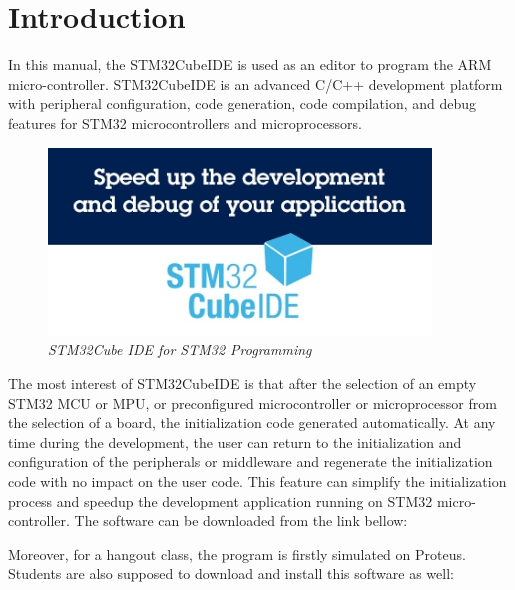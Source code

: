 
\section{Introduction}
In this manual, the STM32CubeIDE is used as an editor to program the ARM micro-controller. STM32CubeIDE is an advanced C/C++ development platform with peripheral configuration, code generation, code compilation, and debug features for STM32 microcontrollers and microprocessors.\\

\begin{figure}[!htp]
    \centering
    \includegraphics[width=4in]{source/picture/bai_1/cubeide.jpg}
    \caption{\textit{STM32Cube IDE for STM32 Programming}}
    \label{bai1_cube}
\end{figure}

The most interest of STM32CubeIDE is that after the selection of an empty STM32 MCU or MPU, or preconfigured microcontroller or microprocessor from the selection of a board, the initialization code generated automatically. At any time during the development, the user can return to the initialization and configuration of the peripherals or middleware and regenerate the initialization code with no impact on the user code. This feature can simplify the initialization process and speedup the development application running on STM32 micro-controller. The software can be downloaded from the link bellow:
\begin{center}
\end{center}

Moreover, for a hangout class, the program is firstly simulated on Proteus. Students are also supposed to download and install this software as well:

\begin{center}
\end{center}

